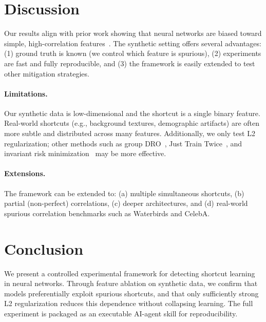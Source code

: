 \documentclass[11pt,a4paper]{article}
\begin{document}
\section{Discussion}

Our results align with prior work showing that neural networks are biased toward simple, high-correlation features~\citep{geirhos2020shortcut,shah2020pitfalls}. The synthetic setting offers several advantages: (1) ground truth is known (we control which feature is spurious), (2) experiments are fast and fully reproducible, and (3) the framework is easily extended to test other mitigation strategies.

\paragraph{Limitations.}
Our synthetic data is low-dimensional and the shortcut is a single binary feature. Real-world shortcuts (e.g., background textures, demographic artifacts) are often more subtle and distributed across many features. Additionally, we only test L2 regularization; other methods such as group DRO~\citep{sagawa2020distributionally}, Just Train Twice~\citep{liu2021just}, and invariant risk minimization~\citep{arjovsky2019invariant} may be more effective.

\paragraph{Extensions.}
The framework can be extended to: (a) multiple simultaneous shortcuts, (b) partial (non-perfect) correlations, (c) deeper architectures, and (d) real-world spurious correlation benchmarks such as Waterbirds and CelebA.

\section{Conclusion}

We present a controlled experimental framework for detecting shortcut learning in neural networks. Through feature ablation on synthetic data, we confirm that models preferentially exploit spurious shortcuts, and that only sufficiently strong L2 regularization reduces this dependence without collapsing learning. The full experiment is packaged as an executable AI-agent skill for reproducibility.
\end{document}
